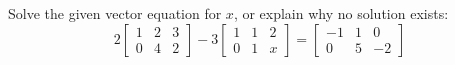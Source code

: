 Solve the given vector equation for $x$, or explain why no solution exists:
%
\begin{equation*}
2 \begin{bmatrix} 1 & 2 & 3 \\ 0 & 4 & 2 \end{bmatrix} - 
3 \begin{bmatrix} 1 & 1 & 2 \\ 0 & 1 & x \end{bmatrix} 
= 
\begin{bmatrix} -1 & 1 & 0 \\ 0 & 5 & -2 \end{bmatrix}
\end{equation*}
%